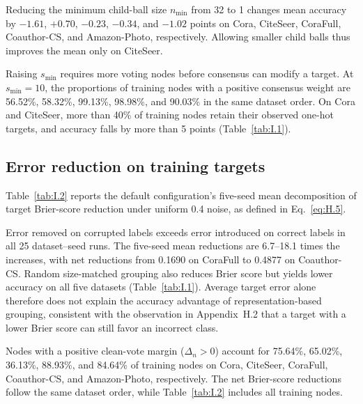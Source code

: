 \documentclass[a4paper,fleqn]{cas-sc}
\begin{document}
Reducing the minimum child-ball size \(n_{\min}\) from 32 to 1 changes mean accuracy by \(-1.61\), \(+0.70\), \(-0.23\), \(-0.34\), and \(-1.02\) points on Cora, CiteSeer, CoraFull, Coauthor-CS, and Amazon-Photo, respectively. Allowing smaller child balls thus improves the mean only on CiteSeer.

Raising \(s_{\min}\) requires more voting nodes before consensus can modify a target. At \(s_{\min}=10\), the proportions of training nodes with a positive consensus weight are 56.52\%, 58.32\%, 99.13\%, 98.98\%, and 90.03\% in the same dataset order. On Cora and CiteSeer, more than 40\% of training nodes retain their observed one-hot targets, and accuracy falls by more than 5 points (Table~\ref{tab:I.1}).

\subsection{Error reduction on training targets}\label{sec:I.2}

Table~\ref{tab:I.2} reports the default configuration's five-seed mean decomposition of target Brier-score reduction under uniform 0.4 noise, as defined in Eq.~\eqref{eq:H.5}.



Error removed on corrupted labels exceeds error introduced on correct labels in all 25 dataset--seed runs. The five-seed mean reductions are 6.7--18.1 times the increases, with net reductions from 0.1690 on CoraFull to 0.4877 on Coauthor-CS. Random size-matched grouping also reduces Brier score but yields lower accuracy on all five datasets (Table~\ref{tab:I.1}). Average target error alone therefore does not explain the accuracy advantage of representation-based grouping, consistent with the observation in Appendix~H.2 that a target with a lower Brier score can still favor an incorrect class.

Nodes with a positive clean-vote margin (\(\Delta_n>0\)) account for 75.64\%, 65.02\%, 36.13\%, 88.93\%, and 84.64\% of training nodes on Cora, CiteSeer, CoraFull, Coauthor-CS, and Amazon-Photo, respectively. The net Brier-score reductions follow the same dataset order, while Table~\ref{tab:I.2} includes all training nodes.
\end{document}
